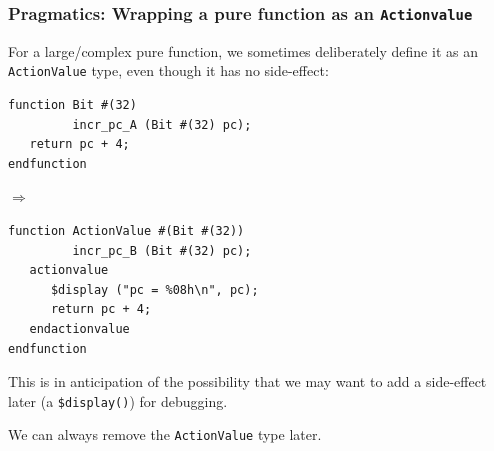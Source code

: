 \begin{frame}[fragile]
\frametitle{Pragmatics: Wrapping a pure function as an {\tt Actionvalue}}

\footnotesize

For a large/complex pure function, we sometimes deliberately define it
as an {\tt ActionValue} type, even though it has no side-effect:

\vspace*{1ex}

\begin{center}
\begin{minipage}{0.45\textwidth}
\begin{Verbatim}[frame=single]
function Bit #(32)
         incr_pc_A (Bit #(32) pc);
   return pc + 4;
endfunction
\end{Verbatim}
\end{minipage}
$\Longrightarrow$
\begin{minipage}{0.45\textwidth}
\begin{Verbatim}[frame=single]
function ActionValue #(Bit #(32))
         incr_pc_B (Bit #(32) pc);
   actionvalue
      $display ("pc = %08h\n", pc);
      return pc + 4;
   endactionvalue
endfunction
\end{Verbatim}
\end{minipage}
\end{center}

\vspace{2ex}

This is in anticipation of the possibility that we may want to add a
side-effect later (a {\tt \$display()}) for debugging.

\vspace{2ex}

We can always remove the {\tt ActionValue} type later.

\end{frame}


